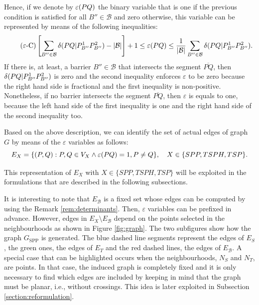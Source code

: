 \documentclass[a4paper,  review, authoryear, 1p.]{elsarticle}
\newcommand{\SPPN}{{\sf{H-SPPN}\xspace }}
\newcommand{\B}{{\mathcal B}}
\newcommand{\EB}{{E^{}_{\mathcal B}}}
\newcommand{\ES}{{E^{}_{S}}}
\newcommand{\ET}{{E^{}_{T}}}
\newcommand{\GSPP}{{G_{\text{SPP}}}}
\newcommand{\segment}[2]{\overline{#1#2}}
\begin{document}
		Hence, if we denote by $\varepsilon(PQ)$ the binary variable that is one if the previous condition is satisfied for all $B''\in\B$ and zero otherwise, this variable can be represented by means of the following inequalities:
		\begin{equation*}\tag{$\varepsilon$-C}\label{eq:varepsilonC}
			\left[\sum_{B''\in\mathcal B}\deltacheck{P}{Q}{P^1_{B''}}{P^2_{B''}}-|\mathcal B|\right] + 1\leq \varepsilonvar{P}{Q}\leq \frac{1}{|\B|}\sum_{B''\in\mathcal B}\deltacheck{P}{Q}{P^1_{B''}}{P^2_{B''}}.
		\end{equation*}
		If there is, at least, a barrier $B''\in\B$ that intersects the segment $\overline{PQ}$, then $\delta(PQ|P^1_{B''}P^2_{B''})$ is zero and the second inequality enforces $\varepsilon$ to be zero because the right hand side is fractional and the first inequality is non-positive. Nonetheless, if no barrier intersects the segment $\segment{P}{Q}$, then $\varepsilon$ is equals to one, because the left hand side of the first inequality is one and the right hand side of the second inequality too. 
		
		Based on the above description, we can identify the set of actual edges of graph $G$ by means of the $\varepsilon$ variables as follows:
		$$ E_X = \{(P, Q):P,Q\in V_X\wedge\varepsilon(PQ)=1, P\neq Q\}, \quad X\in \{SPP,TSPH,TSP\}.$$
		
		This representation of $E_X$ with $X\in \{SPP,TSPH,TSP\}$ will be exploited in the formulations that are described in the following subsections. 
		
		
		It is interesting to note that $\EB$ is a fixed set whose edges can be computed by using the Remark \ref{rem:determinants}. Then, $\varepsilon$ variables can be prefixed in advance. However, edges in $E_X\setminus \EB$ depend on the points selected in the neighbourhoods as shown in Figure \ref{fig:graph}.  The two subfigures show how the graph $\GSPP$ is generated. The blue dashed line segments represent the edges of $\ES$, the green ones, the edges of $\ET$ and the red dashed lines, the edges of $\EB$. A special case that can be highlighted  occurs when the neighbourhoods, $N_S$ and $N_T$, are points. In that case, the induced graph is completely fixed and it is only necessary to find which edges are included by keeping in mind that the graph must be planar, i.e., without crossings. This idea is later exploited in Subsection \ref{section:reformulation}.
		
		
		
\end{document}
